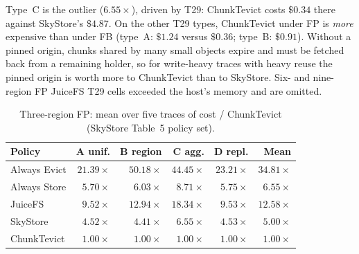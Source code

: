 Type~C is the outlier ($6.55\times$), driven by {T}29: ChunkTevict costs $\$0.34$ there against SkyStore's $\$4.87$.
On the other {T}29 types, ChunkTevict under {FP} is \emph{more} expensive than under {FB} (type~A: $\$1.24$ versus $\$0.36$; type~B: $\$0.91$).
Without a pinned origin, chunks shared by many small objects expire and must be fetched back from a remaining holder, so for write-heavy traces with heavy reuse the pinned origin is worth more to ChunkTevict than to SkyStore.
Six- and nine-region {FP} JuiceFS {T}29 cells exceeded the host's memory and are omitted.

\begin{table}[t]
\centering
\caption{Three-region {FP}: mean over five traces of cost / ChunkTevict (SkyStore Table~5 policy set).}
\label{tab:fp3}
\setlength{\tabcolsep}{2.8pt}
{\scriptsize
\begin{tabular}{lrrrrr}
\toprule
Policy & A unif. & B region & C agg. & D repl. & Mean \\
\midrule
Always Evict & $21.39\times$ & $50.18\times$ & $44.45\times$ & $23.21\times$ & $34.81\times$ \\
Always Store & $5.70\times$ & $6.03\times$ & $8.71\times$ & $5.75\times$ & $6.55\times$ \\
JuiceFS & $9.52\times$ & $12.94\times$ & $18.34\times$ & $9.53\times$ & $12.58\times$ \\
SkyStore & $4.52\times$ & $4.41\times$ & $6.55\times$ & $4.53\times$ & $5.00\times$ \\
ChunkTevict & $1.00\times$ & $1.00\times$ & $1.00\times$ & $1.00\times$ & $1.00\times$ \\
\bottomrule
\end{tabular}}
\end{table}

